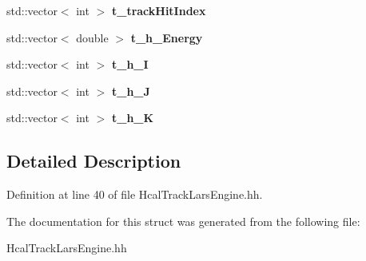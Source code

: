 \begin{DoxyCompactItemize}
\item 
std\-::vector$<$ int $>$ {\bfseries t\-\_\-track\-Hit\-Index}\label{structmarlin_1_1HcalTrackLarsEngine_1_1EventTracks_a365a327f54fdd172ab587471e2ec80c9}

\item 
std\-::vector$<$ double $>$ {\bfseries t\-\_\-h\-\_\-\-Energy}\label{structmarlin_1_1HcalTrackLarsEngine_1_1EventTracks_a0b68bc1477a79ffa9ba510de1baab00d}

\item 
std\-::vector$<$ int $>$ {\bfseries t\-\_\-h\-\_\-\-I}\label{structmarlin_1_1HcalTrackLarsEngine_1_1EventTracks_af8b2b5c111fd7364d8bfa55e6378c717}

\item 
std\-::vector$<$ int $>$ {\bfseries t\-\_\-h\-\_\-\-J}\label{structmarlin_1_1HcalTrackLarsEngine_1_1EventTracks_a45e59e176ffe04314bb717244e3fe378}

\item 
std\-::vector$<$ int $>$ {\bfseries t\-\_\-h\-\_\-\-K}\label{structmarlin_1_1HcalTrackLarsEngine_1_1EventTracks_aea3f09c827cc8f2e5159d9002e88084e}

\end{DoxyCompactItemize}


\subsection{Detailed Description}


Definition at line 40 of file Hcal\-Track\-Lars\-Engine.\-hh.



The documentation for this struct was generated from the following file\-:\begin{DoxyCompactItemize}
\item 
Hcal\-Track\-Lars\-Engine.\-hh\end{DoxyCompactItemize}
